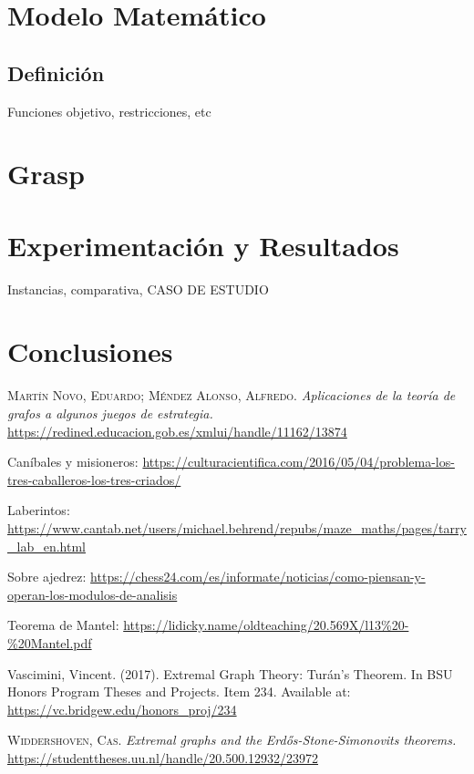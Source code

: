 \documentclass[12pt,a4paper]{book}
\begin{document}
\chapter{Modelo Matemático}

\section{Definición}
Funciones objetivo, restricciones, etc

\chapter{Grasp}




\chapter{Experimentación y Resultados}

Instancias, comparativa, CASO DE ESTUDIO

\chapter{Conclusiones}





\begin{thebibliography}{X}
     \textsc{Martín Novo, Eduardo; Méndez Alonso, Alfredo}.
    \textit{Aplicaciones de la teoría de grafos a algunos juegos de estrategia.}
    \url{https://redined.educacion.gob.es/xmlui/handle/11162/13874}

     Caníbales y misioneros: \url{https://culturacientifica.com/2016/05/04/problema-los-tres-caballeros-los-tres-criados/}

     Laberintos: \url{https://www.cantab.net/users/michael.behrend/repubs/maze_maths/pages/tarry_lab_en.html}
    
     Sobre ajedrez: \url{https://chess24.com/es/informate/noticias/como-piensan-y-operan-los-modulos-de-analisis}

     Teorema de Mantel: \url{https://lidicky.name/oldteaching/20.569X/l13%20-%20Mantel.pdf}

     Vascimini, Vincent. (2017). Extremal Graph Theory: Turán’s Theorem. 
    In BSU Honors Program Theses and Projects. Item 234. Available at: \url{https://vc.bridgew.edu/honors_proj/234}

     \textsc{Widdershoven, Cas.} \textit{Extremal graphs and the Erd{\H{o}}s-Stone-Simonovits theorems.}
    \url{https://studenttheses.uu.nl/handle/20.500.12932/23972}

\end{thebibliography}
\end{document}
